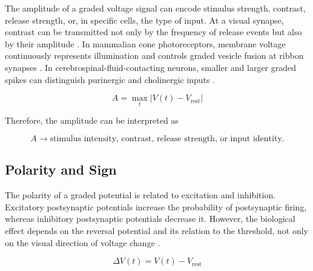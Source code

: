 \documentclass[a4paper]{article}
\begin{document}
            The amplitude of a graded voltage signal can encode stimulus strength, contrast, release strength, or, in specific cells, the type of input. At a visual synapse, contrast can be transmitted not only by the frequency of release events but also by their amplitude \citep{james-2019-an-amplitude-code-transmits-information-at-a-visual-synapse}. In mammalian cone photoreceptors, membrane voltage continuously represents illumination and controls graded vesicle fusion at ribbon synapses \citep{grabner-2023-mechanisms-of-simultaneous-linear-and-nonlinear-computations-at-the-mammalian-cone-photoreceptor-synapse}. In cerebrospinal-fluid-contacting neurons, smaller and larger graded spikes can distinguish purinergic and cholinergic inputs \citep{johnson-2023-graded-spikes-differentially-signal-neurotransmitter-input-in-cerebrospinal-fluid-contacting-neurons-of-the-mouse-spinal-cord}.
            
            \begin{equation}
                A
                =
                \max_t |V(t)-V_{\mathrm{rest}}|
            \end{equation}
            
            Therefore, the amplitude can be interpreted as
            
            \begin{equation}
                A
                \rightarrow
                \text{stimulus intensity, contrast, release strength, or input identity}.
            \end{equation}
        
        \subsection{Polarity and Sign}
            
            The polarity of a graded potential is related to excitation and inhibition. Excitatory postsynaptic potentials increase the probability of postsynaptic firing, whereas inhibitory postsynaptic potentials decrease it. However, the biological effect depends on the reversal potential and its relation to the threshold, not only on the visual direction of voltage change \citep{purves-2001-excitatory-and-inhibitory-postsynaptic-potentials,purves-2001-summation-of-synaptic-potentials}.
            
            \begin{equation}
                \Delta V(t)
                =
                V(t)-V_{\mathrm{rest}}
            \end{equation}
            
\end{document}
